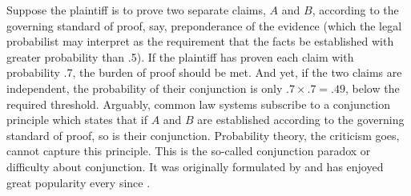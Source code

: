 \documentclass{article}
\begin{document}
\label{subsec:conj}


Suppose the plaintiff is to prove two separate claims, $A$ and $B$, according to the governing standard of proof, say, preponderance of the evidence (which the legal probabilist may interpret as the requirement that the facts be established with greater  probability than .5). If the plaintiff has proven each claim with   probability .7, the burden of proof should be met. And yet, if the two claims are independent, the probability of their conjunction is only $.7\times.7=.49$, below the required threshold.  %
Arguably, common law systems subscribe to a conjunction principle which states that if $A$ and $B$ are established according to the governing standard of proof, so is their conjunction. Probability theory, the criticism goes, cannot capture this principle. This is the so-called conjunction paradox or difficulty about conjunction. It was originally formulated by \cite{Cohen1977The-probable-an} and has enjoyed great popularity every since \citep{Allen1986A-Reconceptuali,Stein2005Foundations-of-,allen2013,haack2011legal,schwartz2017ConjunctionProblemLogic,AllenPardo2019relative}. 
\end{document}
